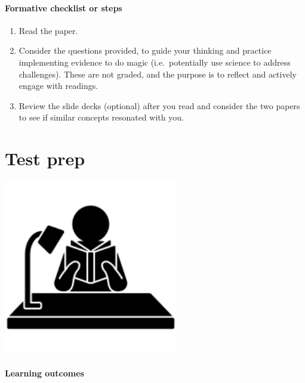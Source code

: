 \documentclass[
]{book}
\providecommand{\tightlist}{%
  \setlength{\itemsep}{0pt}\setlength{\parskip}{0pt}}
\begin{document}
\hypertarget{formative-checklist-or-steps-3}{%
\subsubsection*{Formative checklist or steps}\label{formative-checklist-or-steps-3}}

\begin{enumerate}
\def\labelenumi{\arabic{enumi}.}
\tightlist
\item
  Read the paper.\\
\item
  Consider the questions provided, to guide your thinking and practice implementing evidence to do magic (i.e.~potentially use science to address challenges). These are not graded, and the purpose is to reflect and actively engage with readings.\\
\item
  Review the slide decks (optional) after you read and consider the two papers to see if similar concepts resonated with you.
\end{enumerate}

\hypertarget{testprep}{%
\chapter{Test prep}\label{testprep}}

\includegraphics[width=3in,height=\textheight]{./testprep.png}

\hypertarget{learning-outcomes-5}{%
\subsubsection*{Learning outcomes}\label{learning-outcomes-5}}
\end{document}
